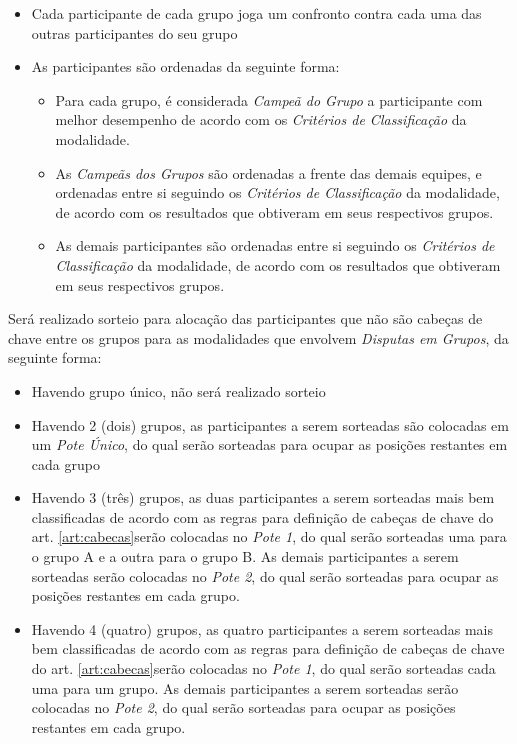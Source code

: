 \begin{itemize}[noitemsep]
	\item Cada participante de cada grupo joga um confronto contra cada uma das outras participantes do seu grupo
	\item As participantes são ordenadas da seguinte forma:
	\begin{itemize}[noitemsep]
		\item Para cada grupo, é considerada \textit{Campeã do Grupo} a participante com melhor desempenho de acordo com os \textit{Critérios de Classificação} da modalidade.
		\item As \textit{Campeãs dos Grupos} são ordenadas a frente das demais equipes, e ordenadas entre si seguindo os \textit{Critérios de Classificação} da modalidade, de acordo com os resultados que obtiveram em seus respectivos grupos.
		\item As demais participantes são ordenadas entre si seguindo os \textit{Critérios de Classificação} da modalidade, de acordo com os resultados que obtiveram em seus respectivos grupos.
	\end{itemize}
\end{itemize}

\noindent
Será realizado sorteio para alocação das participantes que não são cabeças de chave entre os grupos para as modalidades que envolvem \textit{Disputas em Grupos}, da seguinte forma:
\begin{itemize}[noitemsep]
	\item Havendo grupo único, não será realizado sorteio
	\item Havendo 2 (dois) grupos, as participantes a serem sorteadas são colocadas em um \textit{Pote Único}, do qual serão sorteadas para ocupar as posições restantes em cada grupo
	\item Havendo 3 (três) grupos, as duas participantes a serem sorteadas mais bem classificadas de acordo com as regras para definição de cabeças de chave do art. \ref{art:cabecas}\ulo serão colocadas no \textit{Pote 1}, do qual serão sorteadas uma para o grupo A e a outra para o grupo B. As demais participantes a serem sorteadas serão colocadas no \textit{Pote 2}, do qual serão sorteadas para ocupar as posições restantes em cada grupo.
	\item Havendo 4 (quatro) grupos, as quatro participantes a serem sorteadas mais bem classificadas de acordo com as regras para definição de cabeças de chave do art. \ref{art:cabecas}\ulo serão colocadas no \textit{Pote 1}, do qual serão sorteadas cada uma para um grupo. As demais participantes a serem sorteadas serão colocadas no \textit{Pote 2}, do qual serão sorteadas para ocupar as posições restantes em cada grupo.
\end{itemize}

